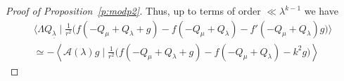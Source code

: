 \documentclass[10pt,reqno]{amsart}
\newcommand{\bs}[1]{\boldsymbol{#1}}
\newcommand{\uln}[1]{{\underline{ #1 }}}
\newcommand{\A}{\mathcal{A}}
\newcommand{\la}{\lambda}
\newcommand{\ang}[1]{\left\langle{#1}\right\rangle}
\numberwithin{equation}{section}
\theoremstyle{remark}
\newcounter{parts}
\newcommand{\ud}{\mathrm{d}}
\newcommand{\0}{\emptyset}
\begin{document}
\begin{proof}[Proof of Proposition~\ref{p:modp2}]
Thus, up to terms of order $\ll \la^{k-1}$ we have 
\begin{multline}  \label{eq:3rdterm2} 
\Big\langle \Lambda Q_\uln\lambda \mid
\frac{1}{r^2}\big(f({-}Q_\mu + Q_\lambda + g) - f({-}Q_\mu + Q_\lambda) - f'({-}Q_\mu + Q_\lambda)g\big)\Big\rangle  \\ \simeq -  \ang{ \A(\la) g \mid \frac{1}{r^2}\big(f({-}Q_\mu + Q_\lambda + g) - f({-}Q_\mu + Q_\lambda) -k^2g\big)} 
\end{multline} 

\end{proof}
\end{document}
